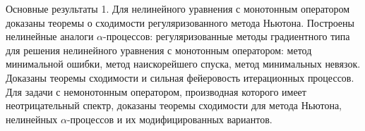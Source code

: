\documentclass[10pt,pdf, mathserif, hyperref={unicode}]{beamer}
\begin{document}

\begin{frame}{Основные результаты}
	1. Для нелинейного уравнения с монотонным оператором доказаны теоремы о сходимости регуляризованного метода Ньютона. 
	Построены нелинейные аналоги $\alpha$-процессов:  регуляризованные методы градиентного типа для решения нелинейного уравнения с монотонным оператором: метод минимальной ошибки, метод наискорейшего спуска, метод минимальных невязок. Доказаны теоремы сходимости и сильная фейеровость итерационных процессов. Для задачи с немонотонным оператором, производная которого имеет неотрицательный спектр, доказаны теоремы сходимости для метода  Ньютона, нелинейных $\alpha$-процессов и их модифицированных вариантов.
	  	
\end{frame}
\end{document}

